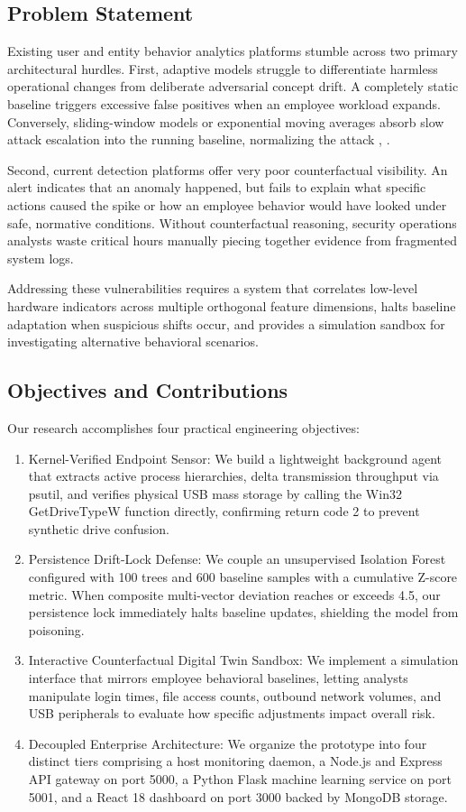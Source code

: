 \documentclass[conference]{IEEEtran}
\begin{document}
\subsection{Problem Statement}
Existing user and entity behavior analytics platforms stumble across two primary architectural hurdles. First, adaptive models struggle to differentiate harmless operational changes from deliberate adversarial concept drift. A completely static baseline triggers excessive false positives when an employee workload expands. Conversely, sliding-window models or exponential moving averages absorb slow attack escalation into the running baseline, normalizing the attack \cite{b5}, \cite{b8}.

Second, current detection platforms offer very poor counterfactual visibility. An alert indicates that an anomaly happened, but fails to explain what specific actions caused the spike or how an employee behavior would have looked under safe, normative conditions. Without counterfactual reasoning, security operations analysts waste critical hours manually piecing together evidence from fragmented system logs.

Addressing these vulnerabilities requires a system that correlates low-level hardware indicators across multiple orthogonal feature dimensions, halts baseline adaptation when suspicious shifts occur, and provides a simulation sandbox for investigating alternative behavioral scenarios.

\subsection{Objectives and Contributions}
Our research accomplishes four practical engineering objectives:
\begin{enumerate}
    \item Kernel-Verified Endpoint Sensor: We build a lightweight background agent that extracts active process hierarchies, delta transmission throughput via psutil, and verifies physical USB mass storage by calling the Win32 GetDriveTypeW function directly, confirming return code 2 to prevent synthetic drive confusion.
    \item Persistence Drift-Lock Defense: We couple an unsupervised Isolation Forest configured with 100 trees and 600 baseline samples with a cumulative Z-score metric. When composite multi-vector deviation reaches or exceeds 4.5, our persistence lock immediately halts baseline updates, shielding the model from poisoning.
    \item Interactive Counterfactual Digital Twin Sandbox: We implement a simulation interface that mirrors employee behavioral baselines, letting analysts manipulate login times, file access counts, outbound network volumes, and USB peripherals to evaluate how specific adjustments impact overall risk.
    \item Decoupled Enterprise Architecture: We organize the prototype into four distinct tiers comprising a host monitoring daemon, a Node.js and Express API gateway on port 5000, a Python Flask machine learning service on port 5001, and a React 18 dashboard on port 3000 backed by MongoDB storage.
\end{enumerate}
\end{document}
